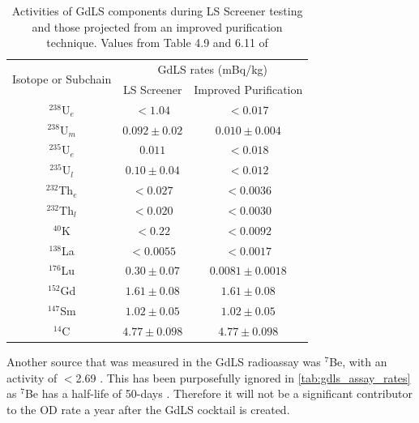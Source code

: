 \begin{table}[]
    \centering
    \begin{tabular}{c|c|c}
        \multirow{2}{*}{Isotope or Subchain}  &  \multicolumn{2}{c}{GdLS rates (mBq/kg)}      \\ 
                             &  LS Screener          & Improved Purification \\ \hline
        ${}^{238}$U$_{e}$      &  $< 1.04$             & $< 0.017$             \\ 
        ${}^{238}$U$_{m}$      &  $0.092\pm0.02$       & $0.010\pm0.004$       \\
        ${}^{235}$U$_{e}$      &  $0.011$              & $< 0.018$             \\
        ${}^{235}$U$_{l}$      &  $0.10\pm0.04$        & $< 0.012$             \\
        ${}^{232}$Th$_{e}$     &  $< 0.027$            & $< 0.0036$            \\
        ${}^{232}$Th$_{l}$     &  $< 0.020$            & $< 0.0030$            \\
        ${}^{40}$K           &  $< 0.22$             & $< 0.0092$            \\
        ${}^{138}$La         &  $< 0.0055$           & $< 0.0017$            \\
        ${}^{176}$Lu         &  $0.30\pm0.07$        & $0.0081\pm0.0018$     \\
        ${}^{152}$Gd       &  $1.61\pm0.08$        & $1.61\pm0.08$         \\
        ${}^{147}$Sm       &  $1.02\pm0.05$        & $1.02\pm0.05$         \\
        ${}^{14}$C         &  $4.77\pm0.098$       & $4.77\pm0.098$ 
    \end{tabular}
    \caption{Activities of GdLS components during LS Screener testing and those projected from an improved purification technique. Values from Table 4.9 and 6.11 of \cite{scotthaselschwardt_thesis_ref}}
    \label{tab:gdls_assay_rates}
\end{table}
\par
Another source that was measured in the GdLS radioassay was ${}^{7}$Be, with an activity of $<$2.69 \cite{scotthaselschwardt_thesis_ref}.
This has been purposefully ignored in \autoref{tab:gdls_assay_rates} as ${}^{7}$Be has a half-life of 50-days \cite{be7_decay_ref}.
Therefore it will not be a significant contributor to the OD rate a year after the GdLS cocktail is created.

